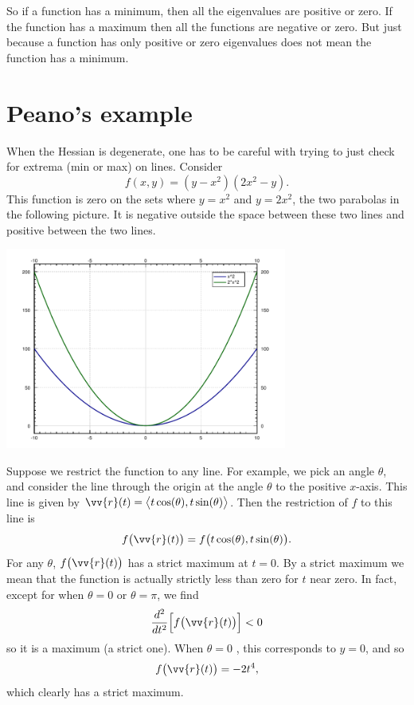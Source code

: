 \documentclass[12pt]{article}
\begin{document}
So if a function has a minimum, then all the eigenvalues are positive or
zero.  If the function has a maximum then all the functions are negative or
zero.  But just because a function has only positive or zero eigenvalues
does not mean the function has a minimum.

\section*{Peano's example}

When the Hessian is degenerate,
one has to be careful with trying to just check for extrema (min or max) on
lines.  Consider
$$
f(x,y) = (y-x^2)(2x^2-y) .
$$
This function is zero on the sets where $y=x^2$ and $y=2x^2$, the two
parabolas in the following picture.  It is negative outside the space
between these two lines and positive between the two lines.
\begin{center}
\includegraphics[width=3.65in]{peanocurves}
\end{center}
Suppose we restrict the function to any line. For example, we pick an angle
$\theta$, and consider the line through the origin at the angle 
$\theta$ to the positive $x$-axis.
This line is given by $\vv{r}(t) = \bigl\langle t \cos(\theta),t
\sin(\theta)\bigr\rangle$.  Then the restriction of $f$ to this line is
$$
f\bigl(\vv{r}(t)\bigr) = f\bigl(t\cos(\theta),t\sin (\theta)\bigr) .
$$
For any $\theta$, $f\bigl(\vv{r}(t)\bigr)$ has a strict maximum at $t=0$.
By a strict maximum we mean that the function is actually
strictly less than zero for $t$ near zero.
In fact, except for when $\theta=0$ or $\theta=\pi$, we find
$$
\frac{d^2}{dt^2} \Bigl[ f \bigl( \vv{r}(t) \bigr) \Bigr] < 0
$$
so it is a maximum (a strict one).  When $\theta = 0$ , this corresponds to
$y=0$, and so
$$
f \bigl( \vv{r}(t) \bigr) = -2t^4 ,
$$
which clearly has a strict maximum.
\end{document}
